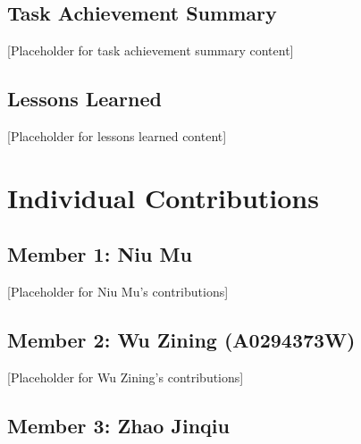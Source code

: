 \documentclass[12pt,a4paper]{article}
\begin{document}
\subsection{Task Achievement Summary}


[Placeholder for task achievement summary content]

\subsection{Lessons Learned}


[Placeholder for lessons learned content]

\section{Individual Contributions}


\subsection{Member 1: Niu Mu}


[Placeholder for Niu Mu's contributions]

\subsection{Member 2: Wu Zining (A0294373W)}


[Placeholder for Wu Zining's contributions]

\subsection{Member 3: Zhao Jinqiu}
\end{document}
